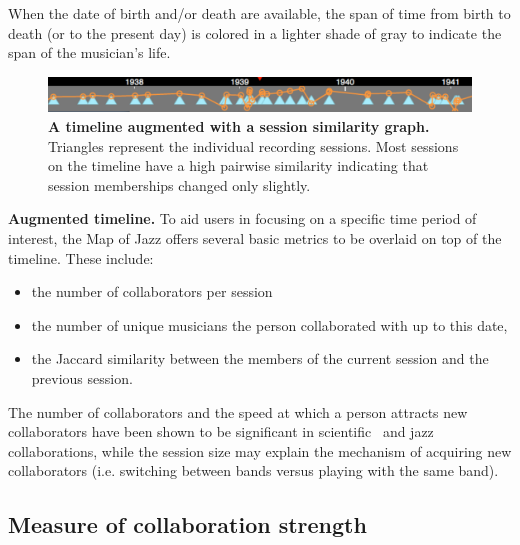 \documentclass[12pt]{cmuthesis}
\begin{document}
  When the date of birth and/or death are available, the span of time from birth to death (or to the present day) is colored in a lighter shade of gray to indicate the span of the musician's life.


  \begin{figure}[ht]
    \includegraphics[width=\linewidth]{figures/timeline}
    \caption{\textbf{A timeline augmented with a session similarity graph.} Triangles represent the individual recording sessions. Most sessions on the timeline have a high pairwise similarity indicating that session memberships changed only slightly.}
    \label{fig:moj:timeline}
  \end{figure}

  
  \textbf{Augmented timeline.} To aid users in focusing on a specific time period of interest, the Map of Jazz offers several basic metrics to be overlaid on top of the timeline. These include: 
  \begin{itemize}
    \item the number of collaborators per session
    \item the number of unique musicians the person collaborated with up to this date,
    \item the Jaccard similarity between the members of the current session and the previous session.
  \end{itemize}
  The number of collaborators and the speed at which a person attracts new collaborators have been shown to be significant in scientific~\cite{Petersen2012} and jazz~\cite{Pinheiro2009} collaborations, while the session size may explain the mechanism of acquiring new collaborators (i.e. switching between bands versus playing with the same band).



  \subsection{Measure of collaboration strength}
\end{document}
